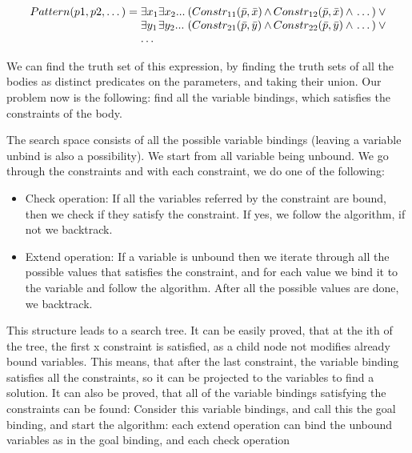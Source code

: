 \begin{equation}
\begin{array}{@{}r@{}l@{}l@{}l@{}l@{}l@{}}
Pattern(p1, p2, \dots) = \;
& \exists{x_1} & \exists{x_2}... \: & 
(Constr_{11}(\bar{p},\bar{x} ) & \, \wedge \, Constr_{12}(\bar{p},\bar{x} ) & \, \wedge \, \dots{}) \: \vee \\

& \exists{y_1} & \exists{y_2}... \: & 
(Constr_{21}(\bar{p},\bar{y} ) & \, \wedge \, Constr_{22}(\bar{p},\bar{y} ) & \, \wedge \, \dots{}) \: \vee \\
& \dots{}
\end{array}
\end{equation}

We can find the truth set of this expression, by finding the truth sets of all the bodies as distinct predicates on the parameters, and taking their union.
Our problem now is the following: find all the variable bindings, which satisfies the constraints of the body.


The search space consists of all the possible variable bindings (leaving a variable unbind is also a possibility). 
We start from all variable being unbound. 
We go through the constraints and with each constraint, we do one of the following:
\begin{itemize}
	\item Check operation: If all the variables referred by the constraint are bound, then we check if they satisfy the constraint. If yes, we follow the algorithm, if not we backtrack.
	\item Extend operation: If a variable is unbound then we iterate through all the possible values that satisfies the constraint, and for each value we bind it to the variable and follow the algorithm. After all the possible values are done, we backtrack.
\end{itemize}

This structure leads to a search tree.
It can be easily proved, that at the ith of the tree, the first x constraint is satisfied, as a child node not modifies already bound variables.
This means, that after the last constraint, the variable binding satisfies all the constraints, so it can be projected to the variables to find a solution.
It can also be proved, that all of the variable bindings satisfying the constraints can be found: 
Consider this variable bindings, and call this the goal binding, and start the algorithm: each extend operation can bind the unbound variables as in the goal binding, and each check operation 

